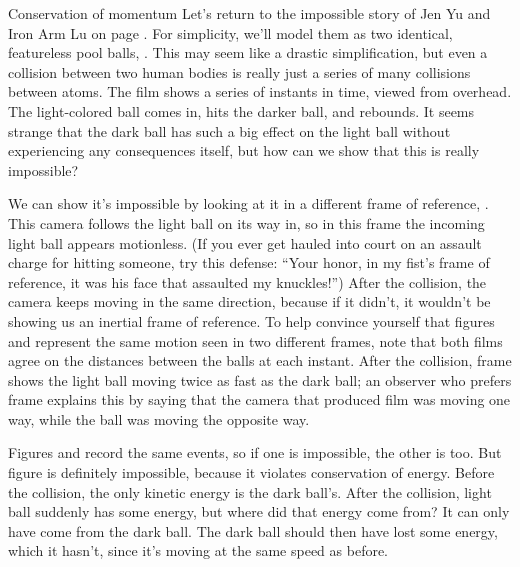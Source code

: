 \begin{envsubsection}{Conservation of momentum}
Let's return to the impossible story of Jen Yu and Iron Arm Lu on page \pageref{tiger}.
For simplicity, we'll model them as two identical, featureless pool balls,
. This may seem like a drastic simplification, but even a collision
between two human bodies is really just a series of many collisions between atoms.
The film shows a series of instants in time, viewed from overhead. The light-colored ball comes in, hits the
darker ball, and rebounds. It seems strange that the dark ball has such a big
effect on the light ball without experiencing any consequences itself, but how can we show that
this is really impossible?


We can show it's impossible by looking at it in a different frame of reference,
. This camera follows the light ball on its way in, so in this
frame the incoming light ball appears motionless. (If you ever get hauled into court
on an assault charge for hitting someone, try this defense: ``Your honor, in my fist's
frame of reference, it was his face that assaulted my knuckles!'') After the collision,
the camera keeps moving in the same direction, because if it didn't, it wouldn't be
showing us an inertial frame of reference. To help convince yourself that figures
 and  represent the same motion seen in two
different frames, note that both films agree on the distances between the balls at
each instant. After the collision, frame  shows the light ball moving twice as fast as the dark
ball; an observer who prefers frame  explains this
by saying that the camera that produced film  was moving one
way, while the ball was moving the opposite way.


Figures  and  record the same
events, so if one is impossible, the other is too. But figure 
is definitely impossible, because it violates conservation of energy. Before
the collision, the only kinetic energy is the dark ball's. After the collision, light
ball suddenly has some energy, but where did that energy come from? It can only have
come from the dark ball. The dark ball should then have lost some energy, which it hasn't,
since it's moving at the same speed as before.


\end{envsubsection}
